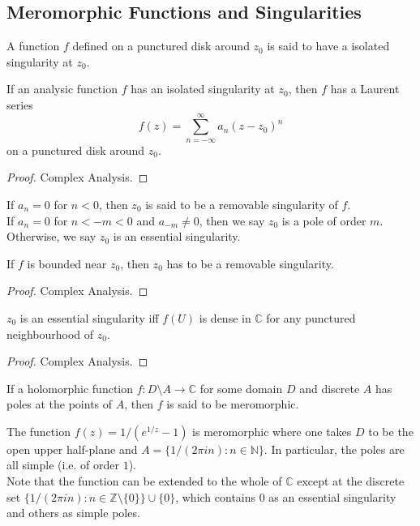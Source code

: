 \subsection{Meromorphic Functions and Singularities}
\begin{definition}
    A function $f$ defined on a punctured disk around $z_0$ is said to have a isolated singularity at $z_0$.
\end{definition}
\begin{proposition}
    If an analysic function $f$ has an isolated singularity at $z_0$, then $f$ has a Laurent series
    $$f(z)=\sum_{n=-\infty}^\infty a_n(z-z_0)^n$$
    on a punctured disk around $z_0$.
\end{proposition}
\begin{proof}
    Complex Analysis.
\end{proof}
\begin{definition}
    If $a_n=0$ for $n<0$, then $z_0$ is said to be a removable singularity of $f$.\\
    If $a_n=0$ for $n<-m<0$ and $a_{-m}\neq 0$, then we say $z_0$ is a pole of order $m$.\\
    Otherwise, we say $z_0$ is an essential singularity.
\end{definition}
\begin{theorem}
    If $f$ is bounded near $z_0$, then $z_0$ has to be a removable singularity.
\end{theorem}
\begin{proof}
    Complex Analysis.
\end{proof}
\begin{theorem}
    $z_0$ is an essential singularity iff $f(U)$ is dense in $\mathbb C$ for any punctured neighbourhood of $z_0$.
\end{theorem}
\begin{proof}
    Complex Analysis.
\end{proof}
\begin{definition}
    If a holomorphic function $f:D\setminus A\to\mathbb C$ for some domain $D$ and discrete $A$ has poles at the points of $A$, then $f$ is said to be meromorphic.
\end{definition}
\begin{example}
    The function $f(z)=1/(e^{1/z}-1)$ is meromorphic where one takes $D$ to be the open upper half-plane and $A=\{1/(2\pi in):n\in\mathbb N\}$.
    In particular, the poles are all simple (i.e. of order $1$).\\
    Note that the function can be extended to the whole of $\mathbb C$ except at the discrete set $\{1/(2\pi in):n\in\mathbb Z\setminus\{0\}\}\cup\{0\}$, which contains $0$ as an essential singularity and others as simple poles.
\end{example}
